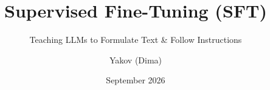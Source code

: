 \documentclass[aspectratio=169]{beamer}
\title{Supervised Fine-Tuning (SFT)}
\subtitle{Teaching LLMs to Formulate Text \& Follow Instructions}
\author{Yakov (Dima)}
\date{September 2026}
\begin{document}
\begin{frame}
  \titlepage
\end{frame}






\end{document}
